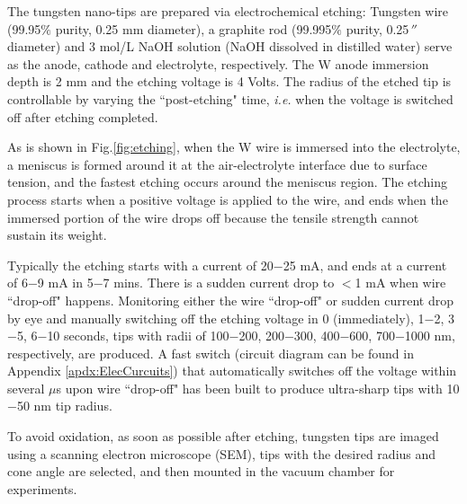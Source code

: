 The tungsten nano-tips are prepared via electrochemical etching: Tungsten wire (99.95$\%$ purity, 0.25 mm diameter), a graphite rod (99.995$\%$ purity, 0.25$\,''$ diameter) and 3 mol/L NaOH solution (NaOH dissolved in distilled water) serve as the anode, cathode and electrolyte, respectively. The W anode immersion depth is 2 mm and the etching voltage is 4 Volts. The radius of the etched tip is controllable by varying the ``post-etching" time, {\it i.e.\@} when the voltage is switched off after etching completed. 

As is shown in Fig.\@ \ref{fig:etching}, when the W wire is immersed into the electrolyte, a meniscus is formed around it at the air-electrolyte interface due to surface tension, and the fastest etching occurs around the meniscus region. The etching process starts when a positive voltage is applied to the wire, and ends when the immersed portion of the wire drops off because the tensile strength cannot sustain its weight. 

Typically the etching starts with a current of 20$-$25 mA, and ends at a current of 6$-$9 mA in 5$-$7 mins. There is a sudden current drop to $<$1 mA when wire ``drop-off" happens. Monitoring either the wire ``drop-off" or sudden current drop by eye and manually switching off the etching voltage in 0 (immediately), 1$-$2, 3$-$5, 6$-$10 seconds, tips with radii of 100$-$200, 200$-$300, 400$-$600, 700$-$1000 nm, respectively, are produced. A fast switch (circuit diagram can be found in Appendix \ref{apdx:ElecCurcuits}) that automatically switches off the voltage within several $\mu$s upon wire ``drop-off" has been built to produce ultra-sharp tips with 10$-$50 nm tip radius.

To avoid oxidation, as soon as possible after etching, tungsten tips are imaged using a scanning electron microscope (SEM), tips with the desired radius and cone angle are selected, and then mounted in the vacuum chamber for experiments.

